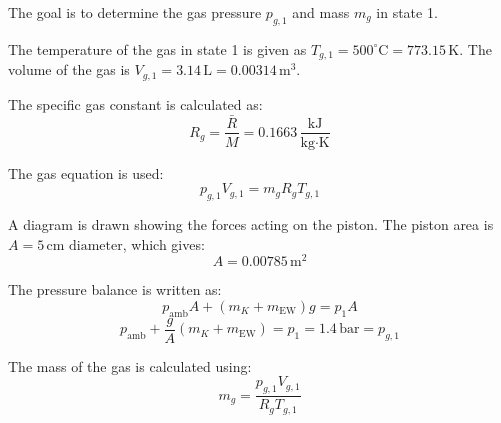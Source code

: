 The goal is to determine the gas pressure \( p_{g,1} \) and mass \( m_g \) in state 1.  

The temperature of the gas in state 1 is given as \( T_{g,1} = 500^\circ\text{C} = 773.15 \, \text{K} \).  
The volume of the gas is \( V_{g,1} = 3.14 \, \text{L} = 0.00314 \, \text{m}^3 \).  

The specific gas constant is calculated as:  
\[
R_g = \frac{\bar{R}}{M} = 0.1663 \, \frac{\text{kJ}}{\text{kg·K}}
\]  

The gas equation is used:  
\[
p_{g,1} V_{g,1} = m_g R_g T_{g,1}
\]  

A diagram is drawn showing the forces acting on the piston. The piston area is \( A = 5 \, \text{cm diameter} \), which gives:  
\[
A = 0.00785 \, \text{m}^2
\]  

The pressure balance is written as:  
\[
p_{\text{amb}} A + (m_K + m_{\text{EW}}) g = p_{1} A
\]  
\[
p_{\text{amb}} + \frac{g}{A} (m_K + m_{\text{EW}}) = p_{1} = 1.4 \, \text{bar} = p_{g,1}
\]  

The mass of the gas is calculated using:  
\[
m_g = \frac{p_{g,1} V_{g,1}}{R_g T_{g,1}}
\]